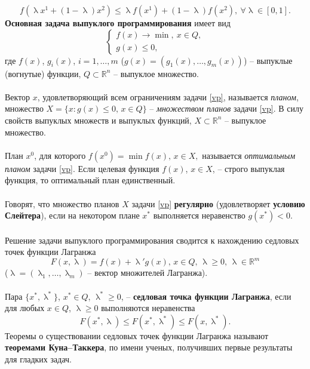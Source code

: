 \documentclass[a4paper, 12pt]{report}
\numberwithin{equation}{section}
\renewcommand{\leq}{\leqslant}
\renewcommand{\geq}{\geqslant}
\renewcommand{\lambda}{\uplambda}
\begin{document}
	\begin{equation}
		f(\lambda x^1 + (1-\lambda)x^2)\leq \lambda f(x^1) + (1-\lambda)f(x^2),\ \forall \lambda \in [0,1].
	\end{equation}
	\textbf{Основная задача выпуклого программирования} имеет вид
	\begin{equation}
		\label{vp}
		\begin{cases}
			f(x)\to \min,\ x \in Q,\\
			g(x) \leq 0,
		\end{cases}
	\end{equation}
	где $f(x)$, $g_i(x)$, $i=1,\ldots,m$ ($g(x) = (g_1(x),\ldots, g_m(x))$) -- выпуклые (вогнутые) функции, $Q \subset \mathbb R^n$ -- выпуклое множество.
	\\\\
	Вектор $x$, удовлетворяющий всем ограничениям задачи \eqref{vp}, называется \textit{планом}, множество 
	$
	X = \{ x : g(x) \leq 0,\, x \in Q \}
	$
	-- \textit{множеством планов} задачи \eqref{vp}. В силу свойств выпуклых множеств и выпуклых функций, $X \subset \mathbb{R}^n$ -- выпуклое множество.
	\\\\
	План $x^0$, для которого 
	$
	f(x^0) = \min f(x),\, x \in X,
	$
	называется \textit{оптимальным планом} задачи \eqref{vp}. Если целевая функция $f(x)$, $x \in X$, -- строго выпуклая функция, то оптимальный план единственный.
	\\\\
	Говорят, что множество планов $X$ задачи \eqref{vp} \textbf{регулярно} (удовлетворяет \textbf{условию Слейтера}), если на некотором плане $x^*$ выполняется неравенство $g(x^*) < 0$.
	\\\\
	Решение задачи выпуклого программирования сводится к нахождению седловых точек функции Лагранжа
	\[
	F(x, \lambda) = f(x) + \lambda' g(x),\, x \in Q,\, \lambda \geq 0,\, \lambda \in \mathbb{R}^m
	\]
	($\lambda = (\lambda_1, \ldots, \lambda_m)$ -- вектор множителей Лагранжа).
	\\\\
	Пара $\{ x^*, \lambda^* \}$, $x^* \in Q$, $\lambda^* \geq 0$, -- \textbf{седловая точка функции Лагранжа}, если для любых $x \in Q$, $\lambda \geq 0$ выполняются неравенства
	\[
	F(x^*, \lambda) \leq F(x^*, \lambda^*) \leq F(x, \lambda^*).
	\]
	Теоремы о существовании седловых точек функции Лагранжа называют \textbf{теоремами Куна--Таккера}, по имени ученых, получивших первые результаты для гладких задач.
	\\\\
\end{document}
